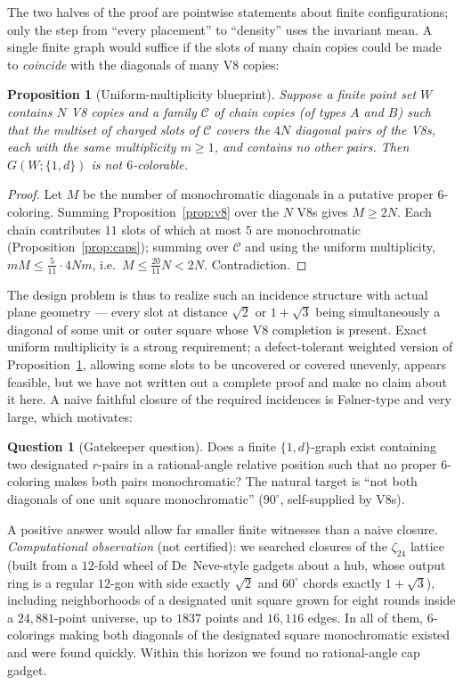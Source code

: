 \documentclass[11pt]{article}
\newtheorem{proposition}[theorem]{Proposition}
\theoremstyle{definition}
\newtheorem{question}[theorem]{Question}
\theoremstyle{remark}
\newcommand{\dd}{d}                          %
\begin{document}
The two halves of the proof are pointwise statements about finite
configurations; only the step from ``every placement'' to ``density''
uses the invariant mean.  A single finite graph would suffice if the
slots of many chain copies could be made to \emph{coincide} with the
diagonals of many V8 copies:

\begin{proposition}[Uniform-multiplicity blueprint]\label{prop:blueprint}
Suppose a finite point set $W$ contains $N$ V8 copies and a family
$\mathcal C$ of chain copies (of types $A$ and $B$) such that the
multiset of charged slots of $\mathcal C$ covers the $4N$ diagonal pairs
of the V8s, each with the same multiplicity $m\ge1$, and contains no
other pairs.  Then $G(W;\{1,\dd\})$ is not $6$-colorable.
\end{proposition}

\begin{proof}
Let $M$ be the number of monochromatic diagonals in a putative proper
$6$-coloring.  Summing Proposition~\ref{prop:v8} over the $N$ V8s gives
$M\ge2N$.  Each chain contributes $11$ slots of which at most $5$ are
monochromatic (Proposition~\ref{prop:caps}); summing over $\mathcal C$
and using the uniform multiplicity, $mM\le\tfrac5{11}\cdot 4Nm$, i.e.\
$M\le\tfrac{20}{11}N<2N$.  Contradiction.
\end{proof}

The design problem is thus to realize such an incidence structure with
actual plane geometry --- every slot at distance $\sqrt2$ or $1+\sqrt3$
being simultaneously a diagonal of some unit or outer square whose
V8 completion is present.  Exact uniform multiplicity is a strong
requirement; a defect-tolerant weighted version of
Proposition~\ref{prop:blueprint}, allowing some slots to be uncovered or
covered unevenly, appears feasible, but we have not written out a
complete proof and make no claim about it here.  A naive faithful closure
of the required incidences is F\o lner-type and very large, which
motivates:

\begin{question}[Gatekeeper question]\label{q:gatekeeper}
Does a finite $\{1,\dd\}$-graph exist containing two designated $r$-pairs
in a rational-angle relative position such that no proper $6$-coloring
makes both pairs monochromatic?  The natural target is ``not both
diagonals of one unit square monochromatic'' ($90^\circ$, self-supplied
by V8s).
\end{question}

A positive answer would allow far smaller finite witnesses than a naive
closure.  \emph{Computational observation} (not certified): we
searched closures of the $\zeta_{24}$ lattice (built from a $12$-fold
wheel of De~Neve-style gadgets about a hub, whose output ring is a
regular $12$-gon with side exactly $\sqrt2$ and $60^\circ$ chords
exactly $1+\sqrt3$), including neighborhoods of a designated unit square
grown for eight rounds inside a $24{,}881$-point universe, up to $1837$
points and $16{,}116$ edges.  In all of them, $6$-colorings making both
diagonals of the designated square monochromatic existed and were found
quickly.
Within this horizon we found no rational-angle cap gadget.
\end{document}
